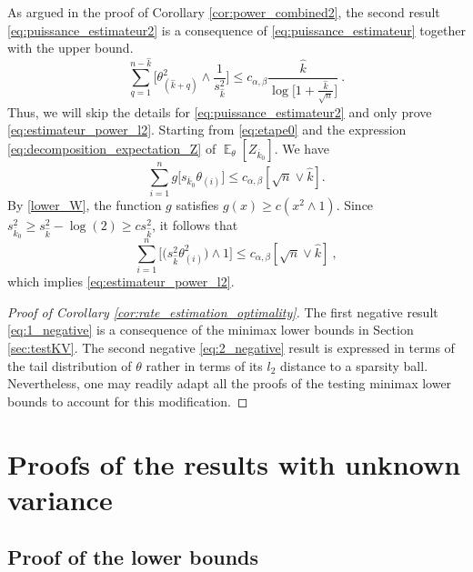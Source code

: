 \documentclass[twoside,11pt]{article}
\def\beq{\begin{equation}}
\def\eeq{\end{equation}}
\newcommand{\E}{\operatorname{\mathbb{E}}}
\newcommand{\<}{\langle}
\renewcommand{\>}{\rangle}
\begin{document}
\bigskip 

As argued in the proof of Corollary \ref{cor:power_combined2}, the second result \eqref{eq:puissance_estimateur2} is a consequence of \eqref{eq:puissance_estimateur} together with the upper bound.
\beq\label{eq:estimateur_power_l2}
 \sum_{q=1}^{n-\widehat{k}} \big[\theta^2_{(\widehat{k}+q)}\wedge \frac{1}{s^2_{\widehat{k}}}\big]\leq c_{\alpha,\beta}\frac{\widehat{k}}{\log\big[1+\frac{\widehat{k}}{\sqrt{n}}]}\ .
\eeq
Thus, we will skip the details for \eqref{eq:puissance_estimateur2} and only prove \eqref{eq:estimateur_power_l2}. Starting from \eqref{eq:etape0} and the expression \eqref{eq:decomposition_expectation_Z} of $\E_{\theta}[Z_{\overline{k}_0}]$. We have
\[
 \sum_{i=1}^{n} g\big[s_{\overline{k}_0} \theta_{(i)}\big]\leq c_{\alpha,\beta}[\sqrt{n} \vee \widehat{k}].
\]
By \eqref{lower_W}, the function $g$ satisfies $g(x)\geq c(x^2\wedge 1)$. Since $s^2_{\overline{k}_0}\geq s^2_{\widehat{k}}-\log(2)\geq cs^2_{\widehat{k}}$, it follows that 
\[
 \sum_{i=1}^{n} \big[\big(s^2_{\widehat{k}}\theta^2_{(i)}\big)\wedge 1 \big]\leq c_{\alpha,\beta}[\sqrt{n} \vee \widehat{k}]\ , 
\]
which implies \eqref{eq:estimateur_power_l2}.



\begin{proof}[Proof of Corollary \ref{cor:rate_estimation_optimality}]
The first negative result \eqref{eq:1_negative} is a consequence of the minimax lower bounds in Section \ref{sec:testKV}. The second negative \eqref{eq:2_negative} result is expressed in terms of the tail distribution of $\theta$ rather in terms of its $l_2$ distance to a sparsity ball. Nevertheless, one may readily adapt all the proofs of the testing minimax lower bounds to account for this modification. 
\end{proof}


\section{Proofs of the results with unknown variance}




\subsection{Proof of the lower bounds}
\end{document}
